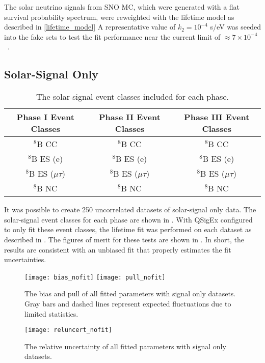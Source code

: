 The solar neutrino signals from SNO MC, which were generated with a flat survival probability spectrum, were reweighted with the lifetime model as described in \ref{lifetime_model} 
A representative value of $k_2 = 10^{-4}$ s/eV was seeded into the fake sets to test the fit performance near the current limit of $\approx7\times10^{-4}$~\cite{picoreti}.

\subsection{Solar-Signal Only}
\label{3phase_sigonly}

\begin{table}
\centering
\begin{tabular}{ccc}
\hline
Phase I Event Classes & Phase II Event Classes & Phase III Event Classes  \\ \hline \hline
$^8$B CC & $^8$B CC & $^8$B CC \\
$^8$B ES (e) & $^8$B ES (e) & $^8$B ES (e) \\
$^8$B ES ($\mu\tau$) & $^8$B ES ($\mu\tau$) & $^8$B ES ($\mu\tau$) \\
$^8$B NC & $^8$B NC & $^8$B NC \\ \hline
\end{tabular}
\caption{
The solar-signal event classes included for each phase.
}
\label{tbl:sigonly_evcls}
\end{table}

It was possible to create 250 uncorrelated datasets of solar-signal only data.
The solar-signal event classes for each phase are shown in .
With QSigEx configured to only fit these event classes, the lifetime fit was performed on each dataset as described in . 
The figures of merit for these tests are shown in . 
In short, the results are consistent with an unbiased fit that properly estimates the fit uncertainties.

\begin{figure}
\centering
\texttt{[image: bias\_nofit]}
\texttt{[image: pull\_nofit]}
\caption{
The bias and pull of all fitted parameters with signal only datasets. Gray bars and dashed lines represent expected fluctuations due to limited statistics.
}
\label{fig:sigonly_biaspull}
\end{figure}

\begin{figure}
\centering
\texttt{[image: reluncert\_nofit]}
\caption{
The relative uncertainty of all fitted parameters with signal only datasets.
}
\label{fig:sigonly_reluncert}
\end{figure}

